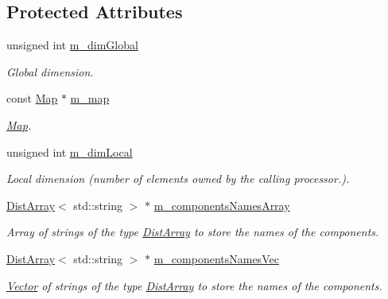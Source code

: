 \subsection*{Protected Attributes}
\begin{DoxyCompactItemize}
\item 
unsigned int \hyperlink{class_q_u_e_s_o_1_1_vector_space_ad3efef4a407fdc5c98fded11f2f2444e}{m\-\_\-dim\-Global}
\begin{DoxyCompactList}\small\item\em Global dimension. \end{DoxyCompactList}\item 
const \hyperlink{class_q_u_e_s_o_1_1_map}{Map} $\ast$ \hyperlink{class_q_u_e_s_o_1_1_vector_space_a752194a4dc937db4db4df2a3b207d3b9}{m\-\_\-map}
\begin{DoxyCompactList}\small\item\em \hyperlink{class_q_u_e_s_o_1_1_map}{Map}. \end{DoxyCompactList}\item 
unsigned int \hyperlink{class_q_u_e_s_o_1_1_vector_space_aa6db91aca8a1f79e27d2f472528850bb}{m\-\_\-dim\-Local}
\begin{DoxyCompactList}\small\item\em Local dimension (number of elements owned by the calling processor.). \end{DoxyCompactList}\item 
\hyperlink{class_q_u_e_s_o_1_1_dist_array}{Dist\-Array}$<$ std\-::string $>$ $\ast$ \hyperlink{class_q_u_e_s_o_1_1_vector_space_a6bcd9c13374cda32f043a93e171aeabf}{m\-\_\-components\-Names\-Array}
\begin{DoxyCompactList}\small\item\em Array of strings of the type \hyperlink{class_q_u_e_s_o_1_1_dist_array}{Dist\-Array} to store the names of the components. \end{DoxyCompactList}\item 
\hyperlink{class_q_u_e_s_o_1_1_dist_array}{Dist\-Array}$<$ std\-::string $>$ $\ast$ \hyperlink{class_q_u_e_s_o_1_1_vector_space_a28b5617b4b30cea1e02e4cb01fd067d8}{m\-\_\-components\-Names\-Vec}
\begin{DoxyCompactList}\small\item\em \hyperlink{class_q_u_e_s_o_1_1_vector}{Vector} of strings of the type \hyperlink{class_q_u_e_s_o_1_1_dist_array}{Dist\-Array} to store the names of the components. \end{DoxyCompactList}\item 

\end{DoxyCompactItemize}
